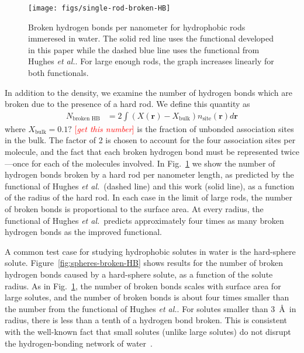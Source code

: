 \documentclass[twocolumn,amsmath,amssymb,prl]{revtex4-1}
\newcommand{\rr}{\textbf{r}}
\newcommand{\fixme}[1]{\textcolor{red}{[\emph{#1}]}}
\newcommand\hughesetal{Hughes \emph{et al.}}
\begin{document}
\begin{figure}
\begin{center}
\texttt{[image: figs/single-rod-broken-HB]}
\end{center}
\caption{Broken hydrogen bonds per nanometer for hydrophobic rods
  immeresed in water.  The solid red line uses the functional developed
  in this paper while the dashed blue line uses the functional from
  \hughesetal. For large enough rods, the graph
  increases linearly for both functionals.}
\label{fig:single-rod-broken-HB}
\end{figure}

In addition to the density, we examine the number of hydrogen bonds
which are broken due to the presence of a hard rod.  We define this
quantity as
\begin{align}
  N_{\text{broken HB}} &= 2 \int (X(\rr) - X_{\text{bulk}})n_{\text{site}}(\rr) d\rr
\end{align}
where $X_{\text{bulk}} = 0.1?$ \fixme{get this number} is the fraction
of unbonded association sites in the bulk.  The factor of 2 is chosen
to account for the four association sites per molecule, and the fact
that each broken hydrogen bond must be represented twice---once for
each of the molecules involved.  In
Fig.~\ref{fig:single-rod-broken-HB} we show the number of hydrogen
bonds broken by a hard rod per nanometer length, as predicted by the
functional of \hughesetal\ (dashed line) and this work (solid line),
as a function of the radius of the hard rod.  In each case in the
limit of large rods, the number of broken bonds is proportional to the
surface area.  At every radius, the functional of
\hughesetal\ predicts approximately four times as many broken hydrogen
bonds as the improved functional.

A common test case for studying hydrophobic solutes in water is the
hard-sphere solute.  Figure~\ref{fig:spheres-broken-HB} shows results
for the number of broken hydrogen bonds caused by a hard-sphere solute,
as a function of the solute radius.  As in
Fig.~\ref{fig:single-rod-broken-HB}, the number of broken bonds scales
with surface area for large solutes, and the number of broken bonds is
about four times smaller than the number from the functional of
\hughesetal.  For solutes smaller than
3~\AA\ in radius, there is less than a tenth of a hydrogen bond
broken. This is consistent with the well-known fact that small solutes
(unlike large solutes) do not disrupt the hydrogen-bonding network of
water~\cite{chandler2005}.
\end{document}
